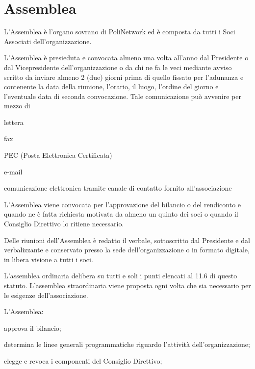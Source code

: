 \documentclass[legalpaper, 11pt]{exam}
\let\tempone\enumerate
\let\temptwo\endenumerate
\renewenvironment{enumerate}{\tempone\addtolength{\itemsep}{-0.45\baselineskip}}{\temptwo}
\begin{document}
\section{Assemblea}

\begin{enumerate}
	\item L’Assemblea è l’organo sovrano di PoliNetwork ed è composta da tutti i Soci Associati dell’organizzazione.
	\item L’Assemblea è presieduta e convocata almeno una volta all’anno dal Presidente o dal Vicepresidente dell’organizzazione o da chi ne fa le veci mediante avviso scritto da inviare almeno 2 (due) giorni prima di quello fissato per l’adunanza e contenente la data della riunione, l’orario, il luogo, l’ordine del giorno e l’eventuale data di seconda convocazione. Tale comunicazione può avvenire per mezzo di
	\vspace{-5pt}
	\begin{enumerate}
		\item lettera
		\item fax
		\item PEC (Posta Elettronica Certificata)
		\item e-mail
		\item comunicazione elettronica tramite canale di contatto fornito all’associazione
	\end{enumerate}
	\item L’Assemblea viene convocata per l’approvazione del bilancio o del rendiconto e quando ne è fatta richiesta motivata da almeno un quinto dei soci o quando il Consiglio Direttivo lo ritiene necessario.
	\item Delle riunioni dell’Assemblea è redatto il verbale, sottoscritto dal Presidente e dal verbalizzante e conservato presso la sede dell’organizzazione o in formato digitale, in libera visione a tutti i soci.
	\item L’assemblea ordinaria delibera su tutti e soli i punti elencati al 11.6 di questo statuto. L’assemblea straordinaria viene proposta ogni volta che sia necessario per le esigenze dell’associazione.
	\item L'Assemblea:
	\vspace{-5pt}
	\begin{enumerate}
		\item approva il bilancio;
		\item determina le linee generali programmatiche riguardo l’attività dell’organizzazione;
		\item elegge e revoca i componenti del Consiglio Direttivo;

\end{enumerate}
\end{enumerate}
\end{document}
